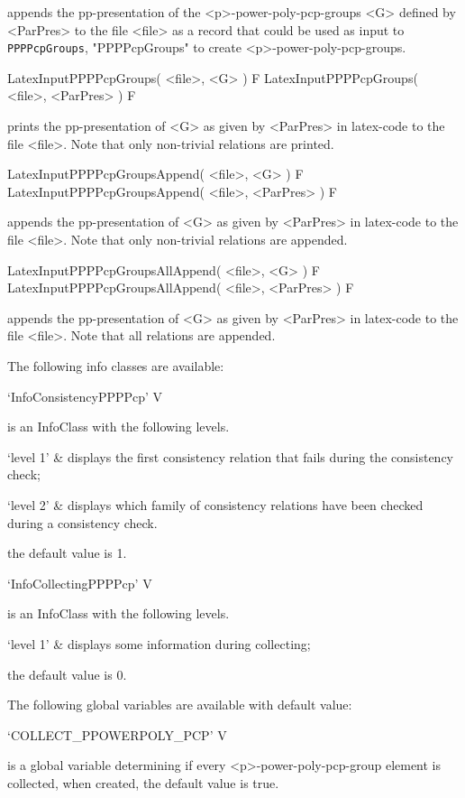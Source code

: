 appends the pp-presentation of the <p>-power-poly-pcp-groups <G> defined by 
<ParPres> to the file <file>  as a record that could be used as input to
{\tt PPPPcpGroups},
"PPPPcpGroups" to create <p>-power-poly-pcp-groups.

\>LatexInputPPPPcpGroups( <file>, <G> ) F
\>LatexInputPPPPcpGroups( <file>, <ParPres> ) F

prints the pp-presentation of <G> as given by <ParPres> in latex-code to the 
file <file>. Note that only non-trivial relations are printed.

\>LatexInputPPPPcpGroupsAppend( <file>, <G> ) F
\>LatexInputPPPPcpGroupsAppend( <file>, <ParPres> ) F

appends the pp-presentation of <G> as given by <ParPres> in latex-code to the 
file <file>. Note that only non-trivial relations are appended.

\> LatexInputPPPPcpGroupsAllAppend( <file>, <G> ) F
\> LatexInputPPPPcpGroupsAllAppend( <file>, <ParPres> ) F

appends the pp-presentation of <G> as given by <ParPres> in latex-code to the 
file <file>. Note that all relations are appended.


The following info classes are available:

\>`InfoConsistencyPPPPcp' V

is an InfoClass with the following levels.

\beginitems
`level 1' & displays the first consistency relation that fails during the consistency check;

`level 2' & displays which family of consistency relations have been checked during a consistency check.
\enditems

the default value is 1.

\>`InfoCollectingPPPPcp' V

is an InfoClass with the following levels.

\beginitems
`level 1' & displays some information during collecting;
\enditems

the default value is 0.


The following global variables are available with default value:

\>`COLLECT_PPOWERPOLY_PCP' V

is a global variable determining if every <p>-power-poly-pcp-group
element is collected, when created, the default value is true.
